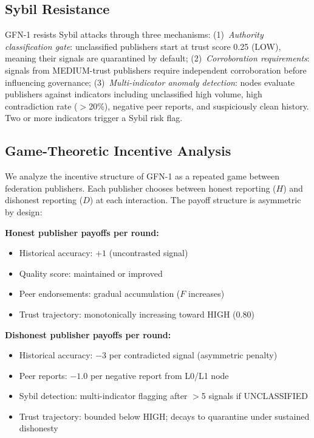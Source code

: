 \documentclass[journal]{IEEEtran}
\begin{document}
\subsection{Sybil Resistance}

GFN-1 resists Sybil attacks through three mechanisms: (1)~\textit{Authority classification gate}: unclassified publishers start at trust score 0.25 (LOW), meaning their signals are quarantined by default; (2)~\textit{Corroboration requirements}: signals from MEDIUM-trust publishers require independent corroboration before influencing governance; (3)~\textit{Multi-indicator anomaly detection}: nodes evaluate publishers against indicators including unclassified high volume, high contradiction rate ($>$20\%), negative peer reports, and suspiciously clean history. Two or more indicators trigger a Sybil risk flag.

\subsection{Game-Theoretic Incentive Analysis}

We analyze the incentive structure of GFN-1 as a repeated game between federation publishers. Each publisher chooses between honest reporting ($H$) and dishonest reporting ($D$) at each interaction. The payoff structure is asymmetric by design:

\textbf{Honest publisher payoffs per round:}
\begin{itemize}
\item Historical accuracy: $+1$ (uncontrasted signal)
\item Quality score: maintained or improved
\item Peer endorsements: gradual accumulation ($F$ increases)
\item Trust trajectory: monotonically increasing toward HIGH (0.80)
\end{itemize}

\textbf{Dishonest publisher payoffs per round:}
\begin{itemize}
\item Historical accuracy: $-3$ per contradicted signal (asymmetric penalty)
\item Peer reports: $-1.0$ per negative report from L0/L1 node
\item Sybil detection: multi-indicator flagging after $>$5 signals if UNCLASSIFIED
\item Trust trajectory: bounded below HIGH; decays to quarantine under sustained dishonesty
\end{itemize}
\end{document}
